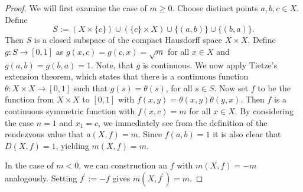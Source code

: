 \begin{proof}
	We will first examine the case of $m\geq 0$. Choose distinct points $a,b,c\in X$. Define
	\[
	S:=(X\times \{c\})\cup (\{c\}\times X)\cup \{(a,b)\}\cup \{(b,a)\}.
	\]
	Then $S$ is a closed subspace of the compact Hausdorff space $X\times X$. Define $g:S\to [0,1]$ as $g(x,c)=g(c,x)=\sqrt{m}$ for all $x\in X$ and $g(a,b)=g(b,a)=1$. Note, that $g$ is continuous.
	We now apply Tietze's extension theorem, which states that there is a continuous function $\theta: X\times X\to [0,1]$ such that $g(s)=\theta(s)$, for all $s\in S$. Now set $f$ to be the function from $X\times X$ to $[0,1]$ with $f(x,y)=\theta(x,y)\theta(y,x)$. Then $f$ is a continuous symmetric function with $f(x,c)=m$ for all $x\in X$. By considering the case $n=1$ and $x_1=c$, we immediately see from the definition of the rendezvous value that $a(X,f)=m$. Since $f(a,b)=1$ it is also clear that $D(X,f)=1$, yielding $m(X,f)=m$.
	
	In the case of $m<0$, we can construction an $f$ with $m(X,f)=-m$ analogously. Setting $f^\prime:=-f$ gives $m(X,f^\prime)=m$.
\end{proof}













